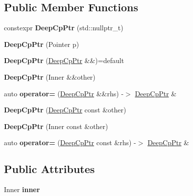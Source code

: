 \subsection*{Public Member Functions}
\begin{DoxyCompactItemize}
\item 
\mbox{\label{structDeepCpPtr_a64b7a88b4b06a0e8cc9500744c7537aa}} 
constexpr {\bfseries Deep\+Cp\+Ptr} (std\+::nullptr\+\_\+t)
\item 
\mbox{\label{structDeepCpPtr_aa524c50ad0f92fd578ddda6b6bd5e9d4}} 
{\bfseries Deep\+Cp\+Ptr} (Pointer p)
\item 
\mbox{\label{structDeepCpPtr_a6783f0e2a4f458e912a3dd96d1cfc4c7}} 
{\bfseries Deep\+Cp\+Ptr} (\mbox{\hyperlink{structDeepCpPtr}{Deep\+Cp\+Ptr}} \&\&)=default
\item 
\mbox{\label{structDeepCpPtr_a7f6462eda75b63adbf9b4a7057f2ae5a}} 
{\bfseries Deep\+Cp\+Ptr} (Inner \&\&other)
\item 
\mbox{\label{structDeepCpPtr_a0887ec473c40c36621cef6976d5de9cb}} 
auto {\bfseries operator=} (\mbox{\hyperlink{structDeepCpPtr}{Deep\+Cp\+Ptr}} \&\&rhs) -\/$>$ \mbox{\hyperlink{structDeepCpPtr}{Deep\+Cp\+Ptr}} \&
\item 
\mbox{\label{structDeepCpPtr_a97e439e69dd95777b9409f5397625861}} 
{\bfseries Deep\+Cp\+Ptr} (\mbox{\hyperlink{structDeepCpPtr}{Deep\+Cp\+Ptr}} const \&other)
\item 
\mbox{\label{structDeepCpPtr_a65f9219c3766b458a83409a271ff7f4b}} 
{\bfseries Deep\+Cp\+Ptr} (Inner const \&other)
\item 
\mbox{\label{structDeepCpPtr_aadccb31ffaf9762e1f65087651ae0871}} 
auto {\bfseries operator=} (\mbox{\hyperlink{structDeepCpPtr}{Deep\+Cp\+Ptr}} const \&rhs) -\/$>$ \mbox{\hyperlink{structDeepCpPtr}{Deep\+Cp\+Ptr}} \&
\end{DoxyCompactItemize}
\subsection*{Public Attributes}
\begin{DoxyCompactItemize}
\item 
\mbox{\label{structDeepCpPtr_ae566f85af6669a34cfa9253eb417afe8}} 
Inner {\bfseries inner}
\end{DoxyCompactItemize}


